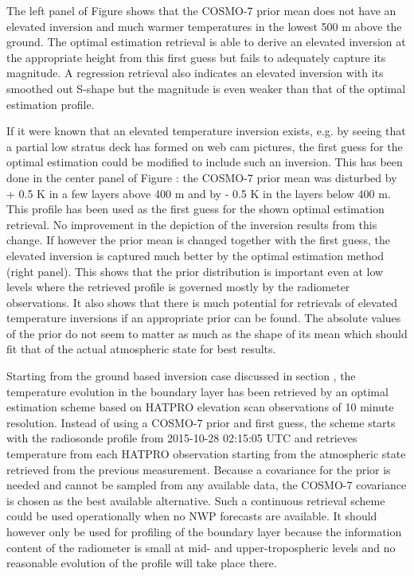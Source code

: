     The left panel of Figure  shows that the COSMO-7 prior
    mean does not have an elevated inversion and much warmer temperatures in
    the lowest 500 m above the ground. The optimal estimation retrieval is able
    to derive an elevated inversion at the appropriate height from this first
    guess but fails to adequately capture its magnitude. A regression retrieval
    also indicates an elevated inversion with its smoothed out S-shape but
    the magnitude is even weaker than that of the optimal estimation profile.

    If it were known that an elevated temperature inversion exists, e.g.
    by seeing that a partial low stratus deck has formed on web cam pictures,
    the first guess for the optimal estimation could be modified to include
    such an inversion. This has been done in the center panel of Figure
    : the COSMO-7 prior mean was disturbed by + 0.5 K
    in a few layers above 400 m and by - 0.5 K in the layers below 400 m.
    This profile has been used as the first guess for the shown optimal
    estimation retrieval. No improvement in the depiction of the inversion
    results from this change. If however the prior mean is changed together
    with the first guess, the elevated inversion is captured much better by
    the optimal estimation method (right panel). This shows that the prior
    distribution is important even at low levels where the retrieved profile
    is governed mostly by the radiometer observations. It also shows that
    there is much potential for retrievals of elevated temperature inversions
    if an appropriate prior can be found. The absolute values of the prior do
    not seem to matter as much as the shape of its mean which should fit that
    of the actual atmospheric state for best results.

\stopsubsection

\startsubsection[title={Boundary Layer Evolution}]

    Starting from the ground based inversion case discussed in section
    \in[ch:gbinv], the temperature evolution in the boundary layer has been
    retrieved by an optimal estimation scheme based on HATPRO elevation scan
    observations of 10 minute resolution. Instead of using a COSMO-7 prior
    and first guess, the scheme starts with the radiosonde profile from
    2015-10-28 02:15:05 UTC and retrieves temperature from each HATPRO
    observation starting from the atmospheric state retrieved from the previous
    measurement. Because a covariance for the prior is needed and cannot be
    sampled from any available data, the COSMO-7 covariance is chosen as the
    best available alternative. Such a continuous retrieval scheme could be
    used operationally when no NWP forecasts are available. It should however
    only be used for profiling of the boundary layer because the information
    content of the radiometer is small at mid- and upper-tropospheric levels
    and no reasonable evolution of the profile will take place there.


